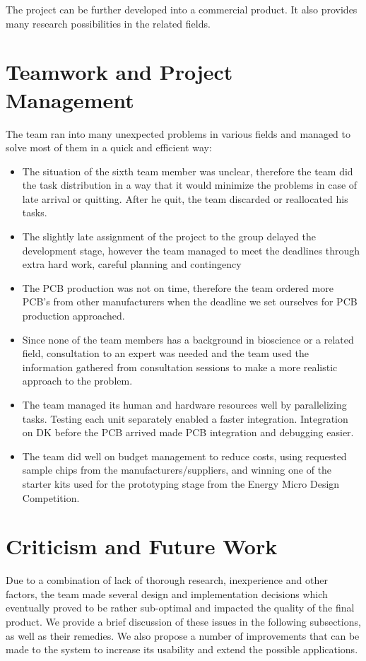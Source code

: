 The project can be further developed into a commercial product. It also provides many research possibilities in the related fields. 

\section{Teamwork and Project Management}
\label{sec:teamwork_prjmgmt}
The team ran into many unexpected problems in various fields and managed to solve most of them in a quick and efficient way:

\begin{itemize}
\item The situation of the sixth team member was unclear, therefore the team did the task distribution in a way that it would minimize the problems in case of late arrival or quitting. After he quit, the team discarded or reallocated his tasks. 
\item The slightly late assignment of the project to the group delayed the development stage, however the team managed to meet the deadlines through extra hard work, careful planning and contingency
\item The PCB production was not on time, therefore the team ordered more PCB’s from other manufacturers when the deadline we set ourselves for PCB production approached. 
\item Since none of the team members has a background in bioscience or a related field, consultation to an expert was needed and the team used the information gathered from consultation sessions to make a more realistic approach to the problem. 
\item The team managed its human and hardware resources well by parallelizing tasks. Testing each unit separately enabled a faster integration. Integration on DK before the PCB arrived made PCB integration and debugging easier. 
\item The team did well on budget management to reduce costs, using requested sample chips from the manufacturers/suppliers, and winning one of the starter kits used for the prototyping stage from the Energy Micro Design Competition.
\end{itemize}

\section{Criticism and Future Work}
\label{sec:future_work}
Due to a combination of lack of thorough research, inexperience and other factors, the team made several design and implementation decisions which eventually proved to be rather sub-optimal and impacted the quality of the final product. We provide a brief discussion of these issues in the following subsections, as well as their remedies. We also propose a number of improvements that can be made to the system to increase its usability and extend the possible applications.

